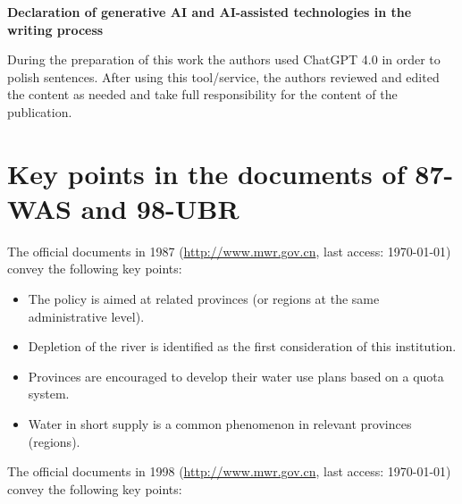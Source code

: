 \documentclass[preprint, 12pt]{elsarticle}
\begin{document}
\textbf{Declaration of generative AI and AI-assisted technologies in the writing process}

During the preparation of this work the authors used ChatGPT 4.0 in order to polish sentences. After using this tool/service, the authors reviewed and edited the content as needed and take full responsibility for the content of the publication.


\label{bib}

\newpage
\appendix\label{appendix}

\section{Key points in the documents of 87-WAS and 98-UBR}\label{secS1}
\renewcommand{\thefigure}{A\arabic{figure}}
\renewcommand{\thetable}{A\arabic{table}}
\setcounter{figure}{0}
\setcounter{table}{0}








The official documents in 1987 (\href{http://www.gov.cn/zhengce/content/2011-03/30/content_3138.htm#}{http://www.mwr.gov.cn}, last access: \today) convey the following key points:

\begin{itemize}
\item The policy is aimed at related provinces (or regions at the same administrative level).
\item Depletion of the river is identified as the first consideration of this institution.
\item Provinces are encouraged to develop their water use plans based on a quota system.
\item Water in short supply is a common phenomenon in relevant provinces (regions).
\end{itemize}

The official documents in 1998
(\href{http://www.mwr.gov.cn/ztpd/2013ztbd/2013fxkh/fxkhswcbcs/cs/flfg/201304/t20130411_433489.html}{http://www.mwr.gov.cn}, last access: \today) convey the following key points:
\end{document}
